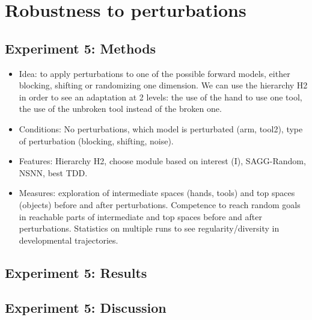 \documentclass[conference]{include/IEEEtran}
\begin{document}
	
%

\section{Robustness to perturbations}

	
	\subsection{Experiment 5: Methods}	
		
		\begin{itemize}
			\item Idea: to apply perturbations to one of the possible forward models, either blocking, shifting or randomizing one dimension. 
					We can use the hierarchy H2 in order to see an adaptation at 2 levels: the use of the hand to use one tool, the use of the unbroken tool instead of the broken one.
			
			\item Conditions: No perturbations, which model is perturbated (arm, tool2), type of perturbation (blocking, shifting, noise).
			
			\item Features: Hierarchy H2, choose module based on interest (I), SAGG-Random, NSNN, best TDD.
			
			\item Measures: exploration of intermediate spaces (hands, tools) and top spaces (objects) before and after perturbations. 
					Competence to reach random goals in reachable parts of intermediate and top spaces before and after perturbations. 
					Statistics on multiple runs to see regularity/diversity in developmental trajectories.
		\end{itemize}
		

	\subsection{Experiment 5: Results}
	
		
	
	\subsection{Experiment 5: Discussion}	
	
\end{document}
